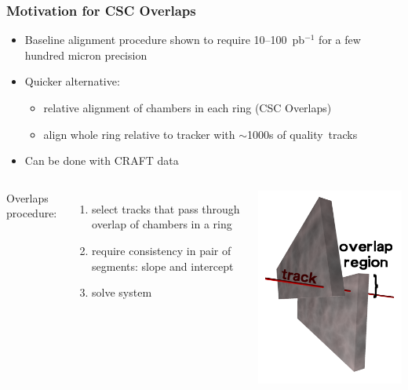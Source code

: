 \documentclass[compress]{beamer}
\begin{document}
\begin{frame}
\frametitle{Motivation for CSC Overlaps}
\begin{itemize}
\item Baseline alignment procedure shown to require 10--100~pb$^{-1}$ for a few hundred micron precision
\item Quicker alternative:
\begin{itemize}\setlength{\itemsep}{0.1 cm}
\item relative alignment of chambers in each ring (CSC Overlaps)
\item align whole ring relative to tracker with $\sim$1000s of \mbox{quality tracks\hspace{-1 cm}}
\end{itemize}
\item Can be done with CRAFT data
\end{itemize}

\begin{columns}
Overlaps procedure:
\begin{enumerate}\setlength{\itemsep}{0 cm}
\item select tracks that pass through overlap of chambers in a ring
\item require consistency in pair of segments: slope and intercept
\item solve system
\end{enumerate}

\includegraphics[width=\linewidth]{overlaps.png}


\end{columns}
\end{frame}
\end{document}
